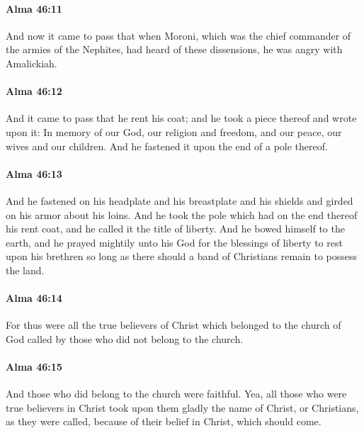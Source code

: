 		\paragraph{Alma 46:11} %
			\label{ALMA-46-11}

			And now it came to pass that when Moroni,
			which was the chief commander of the armies of the Nephites,
			had heard of these dissensions,
			he was angry with Amalickiah.

		\paragraph{Alma 46:12} %
			\label{ALMA-46-12}

			And it came to pass that he rent his coat;
			and he took a piece thereof and wrote upon it:
			In memory of our God, our religion and freedom, and our peace,
			our wives and our children.
			And he fastened it upon the end of a pole thereof.

		\paragraph{Alma 46:13} %
			\label{ALMA-46-13}

			And he fastened on his headplate and his breastplate and his shields
			and girded on his armor about his loins.
			And he took the pole which had on the end thereof his rent coat,
			and he called it the title of liberty.
			And he bowed himself to the earth,
			and he prayed mightily unto his God
			for the blessings of liberty to rest upon his brethren
			so long as there should a band of Christians remain to possess the land.

		\paragraph{Alma 46:14} %
			\label{ALMA-46-14}

			For thus were all the true believers of Christ
			which belonged to the church of God
			called by those who did not belong to the church.

		\paragraph{Alma 46:15} %
			\label{ALMA-46-15}

			And those who did belong to the church were faithful.
			Yea, all those who were true believers in Christ
			took upon them gladly the name of Christ,
			or Christians, as they were called,
			because of their belief in Christ, which should come.

